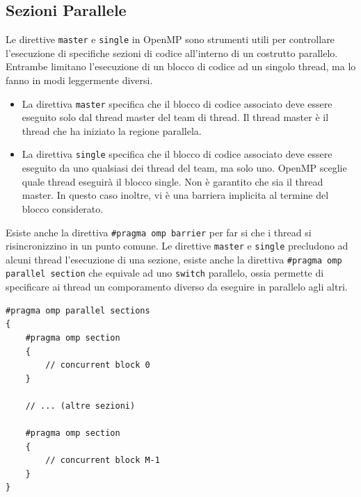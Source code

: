 \documentclass[10pt, letterpaper]{report}
\begin{document}
\subsection{Sezioni Parallele}
Le direttive \texttt{master} e \texttt{single} in OpenMP sono strumenti utili per controllare l'esecuzione di specifiche sezioni di codice all'interno di un costrutto parallelo.  Entrambe limitano l'esecuzione di un blocco di codice ad un singolo thread, ma lo fanno in modi leggermente diversi.\begin{itemize}
    \item La direttiva \texttt{master} specifica che il blocco di codice associato deve essere eseguito solo dal thread master del team di thread. Il thread master è il thread che ha iniziato la regione parallela.
    \item La direttiva \texttt{single} specifica che il blocco di codice associato deve essere eseguito da uno qualsiasi dei thread del team, ma solo uno. OpenMP sceglie quale thread eseguirà il blocco single. Non è garantito che sia il thread master. In questo caso inoltre, vi è una barriera implicita al termine del blocco considerato.
\end{itemize}
Esiste anche la direttiva \texttt{\#pragma omp barrier} per far si che i thread si risincronizzino in un punto comune.\acc 
Le direttive \texttt{master} e \texttt{single} precludono ad alcuni thread l'esecuzione di una sezione, esiste anche la direttiva \texttt{\#pragma omp parallel section} che equivale ad uno \texttt{switch} parallelo, ossia permette di specificare ai thread un comporamento diverso da eseguire in parallelo agli altri.
\begin{lstlisting}[style=CStyle]
#pragma omp parallel sections
{
    #pragma omp section
    {
        // concurrent block 0
    }

    // ... (altre sezioni)

    #pragma omp section
    {
        // concurrent block M-1
    }
}
\end{lstlisting}
\flowerLine 
\end{document}
